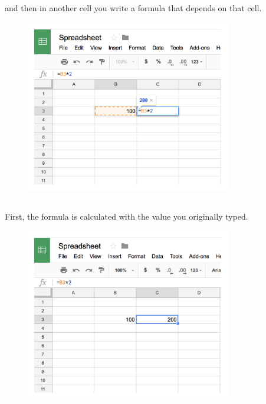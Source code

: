 \documentclass[
  letterpaper,
  DIV=11,
  numbers=noendperiod]{scrreprt}
\begin{document}
\hypertarget{section-12}{%
\subsection{}\label{section-12}}

and then in another cell you write a formula that depends on that cell.

\begin{figure}

{\centering \includegraphics[width=0.8\textwidth,height=\textheight]{./images/spreadsheet-3.png}

}

\end{figure}

\hypertarget{section-13}{%
\subsection{}\label{section-13}}

First, the formula is calculated with the value you originally typed.

\begin{figure}

{\centering \includegraphics[width=0.8\textwidth,height=\textheight]{./images/spreadsheet-4.png}

}

\end{figure}
\end{document}
